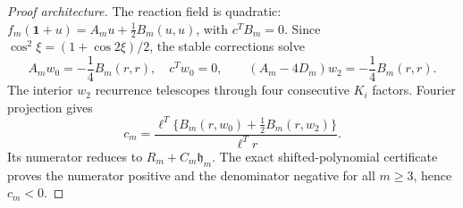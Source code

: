 \documentclass[11pt]{article}
\theoremstyle{definition}
\newcommand{\1}{\mathbf 1}
\begin{document}
\begin{proof}[Proof architecture]
The reaction field is quadratic:
$f_m(\1+u)=A_mu+\tfrac12B_m(u,u)$, with $c^TB_m=0$.  Since
$\cos^2\xi=(1+\cos2\xi)/2$, the stable corrections solve
\begin{equation}\label{eq:w0w2unit}
 A_mw_0=-\frac14B_m(r,r),\quad c^Tw_0=0,
 \qquad (A_m-4D_m)w_2=-\frac14B_m(r,r).
\end{equation}
The interior $w_2$ recurrence telescopes through four consecutive $K_i$
factors.  Fourier projection gives
\begin{equation}\label{eq:cubicformula}
 c_m=\frac{\ell^T\{B_m(r,w_0)+\tfrac12B_m(r,w_2)\}}{\ell^Tr}.
\end{equation}
Its numerator reduces to $R_m+C_m\mathfrak h_m$.  The exact shifted-polynomial
certificate proves the numerator positive and the denominator negative for
all $m\ge3$, hence $c_m<0$.


\end{proof}
\end{document}
